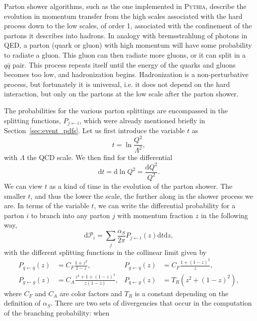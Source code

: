 Parton shower algorithms, such as the one implemented in \textsc{Pythia}, describe the evolution in
momentum transfer from the high scales associated with the hard process down to the low scales, of
order 1\GeV, associated with the confinement of the partons it describes into hadrons. 
In analogy with bremsstrahlung of photons in QED, a parton (quark or gluon) with high momentum will
have some probability to radiate a gluon. This gluon can then radiate more gluons, or it can split
in a $q\bar{q}$ pair. This process repeats itself until the energy of the quarks and gluons becomes
too low, and hadronization begins. Hadronization is a non-perturbative process, but fortunately it
is universal, i.e. it does not depend on the hard interaction, but only on the partons at the low
scale after the parton shower.

The probabilities for the various parton splittings are encompassed in the splitting functions,
$P_{j\leftarrow i}$, which were already mentioned briefly in Section~\ref{sec:event_pdfs}.
Let us first introduce the variable $t$ as
\begin{equation}
  t = \ln\frac{Q^2}{\Lambda^2},
\end{equation}
with $\Lambda$ the QCD scale. We then find for the differential
\begin{equation}
  \text{d}t = \text{d}\ln Q^2 = \frac{\text{d}Q^2}{Q^2}.
\end{equation}
We can view $t$ as a kind of time in the evolution of the parton shower. The smaller $t$, and
thus the lower the scale, the further along in the shower process we are. 
In terms of the variable $t$, we can write the differential probability for a parton $i$ to branch
into any parton $j$ with momentum fraction $z$ in the following way,
\begin{equation}
  \text{d}\mathcal{P}_i = \sum_j \frac{\alpha_S}{2\pi} P_{j\leftarrow i}(z)\text{d}t\text{d}z,
\label{eq:splitting}
\end{equation}
with the different splitting functions in the collinear limit given by
\begin{align}
  P_{q\leftarrow q}(z) &= C_F \frac{1 + z^2}{1 - z}, & 
  P_{g\leftarrow q}(z) &= C_F \frac{1 + (1-z)^2}{z}, \\
  P_{g\leftarrow g}(z) &= C_A \frac{z^4 + 1 + (1-z)^4}{z(1-z)}, &
  P_{q\leftarrow g}(z) &= T_R (z^2 + (1-z)^2), 
\end{align}
where $C_F$ and $C_A$ are color factors and $T_R$ is a constant depending on the definition of
$\alpha_S$. 
There are two sets of divergencies that occur in the computation of the branching probability: when
